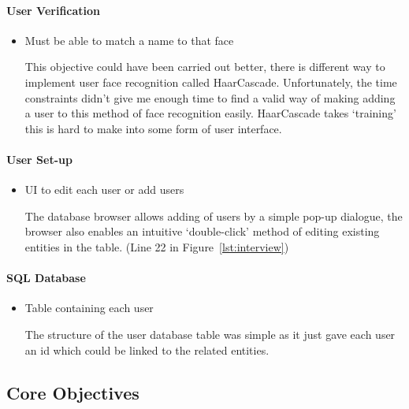 \documentclass[12pt,a4paper]{report}
\newcounter{Figure}
\begin{document}
		\paragraph{User Verification}
			\begin{itemize}

				\item Must be able to match a name to that face

				This objective could have been carried out better, there is different way to implement user face recognition called HaarCascade. 
				Unfortunately, the time constraints didn't give me enough time to find a valid way of making adding a user to this method of face
				recognition easily. HaarCascade takes `training' this is hard to make into some form of user interface.


			\end{itemize}

		\paragraph{User Set-up}

			\begin{itemize}
				\item UI to edit each user or add users

				The database browser allows adding of users by a simple pop-up dialogue, the browser also enables an intuitive `double-click' method
				of editing existing entities in the table. (Line 22 in Figure~\ref{lst:interview})

			\end{itemize}


		\paragraph{SQL Database}
		
			\begin{itemize}
				\item Table containing each user

				The structure of the user database table was simple as it just gave each user an id which could be linked to the related entities.

			\end{itemize}

	\subsection{Core Objectives}
		
\end{document}
